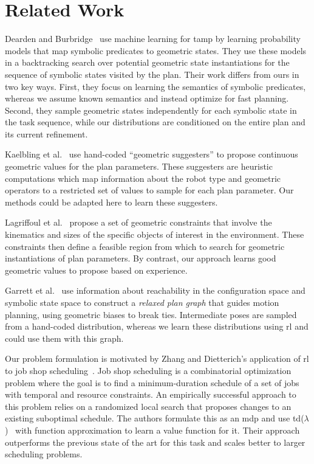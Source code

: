 \section{Related Work}
Dearden and Burbridge~\cite{deardenplanningtamp} use machine learning for {\sc tamp} by learning probability
models that map symbolic predicates to geometric states. They use these models in a backtracking search
over potential geometric state instantiations for the sequence of symbolic states visited by the plan.
Their work differs from ours in two key ways. First, they focus on learning the semantics of symbolic predicates, whereas
we assume known semantics and instead optimize for fast planning. Second, they sample geometric states independently
for each symbolic state in the task sequence, while our distributions are conditioned on the
entire plan and its current refinement.

Kaelbling et al.~\cite{kaelbling2011hierarchical} use hand-coded ``geometric suggesters'' to propose
continuous geometric values for the plan parameters. These suggesters are heuristic
computations which map information about the robot type and geometric operators to a restricted
set of values to sample for each plan parameter. Our methods could be adapted here to learn these
suggesters.

Lagriffoul et al.~\cite{lagriffoul2014orientation}
propose a set of geometric constraints that involve the kinematics and sizes of the specific objects of
interest in the environment. These constraints then define a feasible region from which to search
for geometric instantiations of plan parameters. By contrast, our approach learns good geometric values
to propose based on experience.

Garrett et al.~\cite{GarrettWAFR14} use information about reachability in the configuration
space and symbolic state space to construct a \emph{relaxed plan graph} that guides motion
planning, using geometric biases to break ties. Intermediate poses are sampled from a hand-coded
distribution, whereas we learn these distributions using {\sc rl} and could use them with this graph.

Our problem formulation is motivated by Zhang and Dietterich's application of {\sc rl} to job
shop scheduling~\cite{JobShopSched}. Job shop scheduling is a combinatorial optimization problem where the goal is to find
a minimum-duration schedule of a set of jobs with temporal and resource constraints. An empirically
successful approach to this problem relies on a randomized local search that proposes changes to an
existing suboptimal schedule. The authors formulate this as an {\sc mdp} and use {\sc td}($\lambda$)~\cite{suttonbarto} with function
approximation to learn a value function for it. Their approach outperforms the previous state of the art for this task and
scales better to larger scheduling problems.

